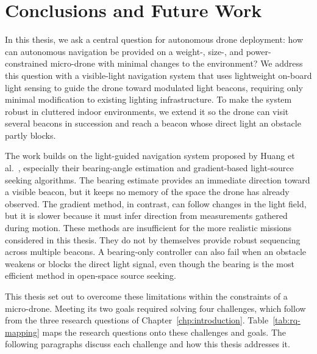 \chapter{Conclusions and Future Work}
\label{chp:conclusions}

In this thesis, we ask a central question for autonomous drone deployment: how can autonomous navigation be provided on a weight-, size-, and power-constrained micro-drone with minimal changes to the environment? We address this question with a visible-light navigation system that uses lightweight on-board light sensing to guide the drone toward modulated light beacons, requiring only minimal modification to existing lighting infrastructure. To make the system robust in cluttered indoor environments, we extend it so the drone can visit several beacons in succession and reach a beacon whose direct light an obstacle partly blocks.

The work builds on the light-guided navigation system proposed by Huang et al.~\cite{huang2026lta}, especially their bearing-angle estimation and gradient-based light-source seeking algorithms. The bearing estimate provides an immediate direction toward a visible beacon, but it keeps no memory of the space the drone has already observed. The gradient method, in contrast, can follow changes in the light field, but it is slower because it must infer direction from measurements gathered during motion. These methods are insufficient for the more realistic missions considered in this thesis. They do not by themselves provide robust sequencing across multiple beacons. A bearing-only controller can also fail when an obstacle weakens or blocks the direct light signal, even though the bearing is the most efficient method in open-space source seeking.

This thesis set out to overcome these limitations within the constraints of a micro-drone. Meeting its two goals required solving four challenges, which follow from the three research questions of Chapter~\ref{chp:introduction}. Table~\ref{tab:rq-mapping} maps the research questions onto these challenges and goals. The following paragraphs discuss each challenge and how this thesis addresses it.

